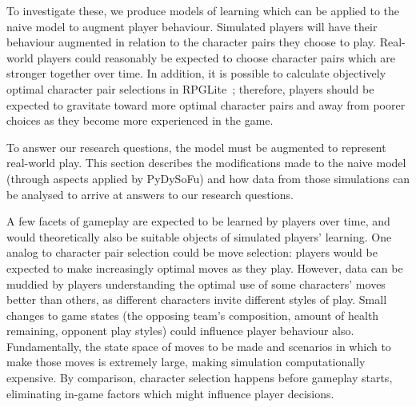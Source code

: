 To investigate these, we produce models of learning which can be applied to the
naive model to augment player behaviour. Simulated players will have their
behaviour augmented in relation to the character pairs they choose to play.
Real-world players could reasonably be expected to choose character pairs which
are stronger together over time. In addition, it is possible to calculate
objectively optimal character pair selections in RPGLite~\cite{kavanagh2021thesis};
therefore, players should be expected to gravitate toward more optimal character
pairs and away from poorer choices as they become more experienced in the game.

To answer our research questions, the model must be augmented to represent
real-world play. This section describes the modifications made to the naive
model (through aspects applied by PyDySoFu) and how data from those simulations
can be analysed to arrive at answers to our research questions.

A few facets of gameplay are expected to be learned by players over time, and
would theoretically also be suitable objects of simulated players' learning. One
analog to character pair selection could be move selection: players would be
expected to make increasingly optimal moves as they play. However, data can be
muddied by players understanding the optimal use of some characters' moves
better than others, as different characters invite different styles of play.
Small changes to game states (the opposing team's composition, amount of health
remaining, opponent play styles) could influence player behaviour also.
Fundamentally, the state space of moves to be made and scenarios in which to
make those moves is extremely large, making simulation computationally
expensive. By comparison, character selection happens before gameplay starts,
eliminating in-game factors which might influence player decisions.

